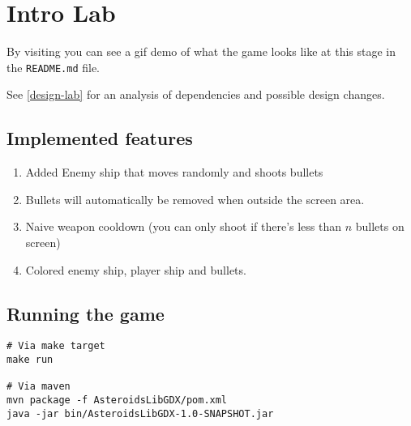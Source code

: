 \section{Intro Lab}
By visiting  you can see a gif demo of what
the game looks like at this stage in the \texttt{README.md} file.

See \ref{design-lab} for an analysis of dependencies and possible design
changes.

\subsection{Implemented features}
\begin{enumerate}
        \item Added Enemy ship that moves randomly and shoots bullets
        \item Bullets will automatically be removed when outside the screen area.
        \item Naive weapon cooldown\: (you can only shoot if there's less than $n$ bullets on screen)
        \item Colored enemy ship, player ship and bullets.
\end{enumerate}

\subsection{Running the game}
\begin{verbatim}
# Via make target
make run

# Via maven
mvn package -f AsteroidsLibGDX/pom.xml
java -jar bin/AsteroidsLibGDX-1.0-SNAPSHOT.jar
\end{verbatim}
